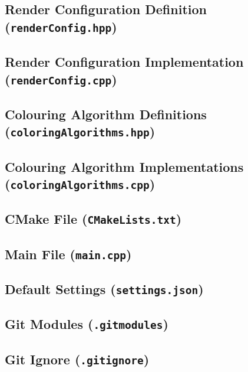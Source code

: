 \pagebreak

\subsection{Render Configuration Definition (\texttt{renderConfig.hpp})}


\pagebreak

\subsection{Render Configuration Implementation (\texttt{renderConfig.cpp})}


\pagebreak

\subsection{Colouring Algorithm Definitions (\texttt{coloringAlgorithms.hpp})}


\pagebreak

\subsection{Colouring Algorithm Implementations \\ (\texttt{coloringAlgorithms.cpp})}


\pagebreak

\subsection{CMake File (\texttt{CMakeLists.txt})}


\pagebreak

\subsection{Main File (\texttt{main.cpp})}


\pagebreak

\subsection{Default Settings (\texttt{settings.json})}


\pagebreak

\subsection{Git Modules (\texttt{.gitmodules})}


\pagebreak

\subsection{Git Ignore (\texttt{.gitignore})}


